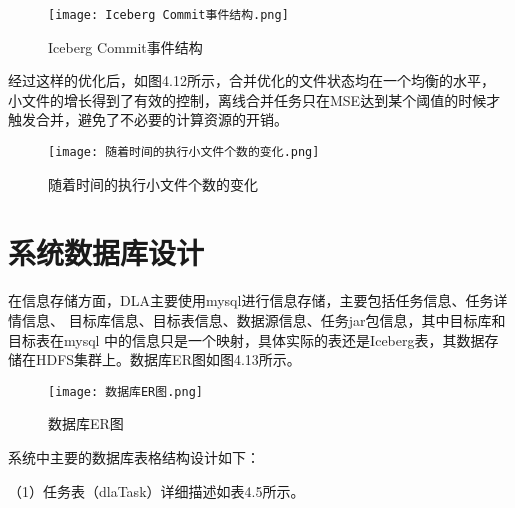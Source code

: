 \begin{figure}[h]
  \centering
  \texttt{[image: Iceberg Commit事件结构.png]}
  \caption{Iceberg Commit事件结构}
  \label{fig:badge}
\end{figure}

经过这样的优化后，如图4.12所示，合并优化的文件状态均在一个均衡的水平，
小文件的增长得到了有效的控制，离线合并任务只在MSE达到某个阈值的时候才触发合并，避免了不必要的计算资源的开销。

\begin{figure}[h]
  \centering
  \texttt{[image: 随着时间的执行小文件个数的变化.png]}
  \caption{随着时间的执行小文件个数的变化}
  \label{fig:badge}
\end{figure}

\section{系统数据库设计}

在信息存储方面，DLA主要使用mysql进行信息存储，主要包括任务信息、任务详情信息、
目标库信息、目标表信息、数据源信息、任务jar包信息，其中目标库和目标表在mysql
中的信息只是一个映射，具体实际的表还是Iceberg表，其数据存储在HDFS集群上。数据库ER图如图4.13所示。

\begin{figure}[h]
  \centering
  \texttt{[image: 数据库ER图.png]}
  \caption{数据库ER图}
  \label{fig:badge}
\end{figure}

系统中主要的数据库表格结构设计如下：

（1）任务表（dlaTask）详细描述如表4.5所示。

